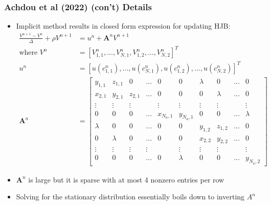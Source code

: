 \documentclass[usenames,dvipsnames, handout, aspectratio=169]{beamer}
\begin{document}
\begin{frame}[label = achdou_details_4]
\frametitle{Achdou et al (2022) (con't) Details}
\small
\begin{itemize}
\item Implicit method results in closed form expression for updating HJB:
\begin{align*}
\frac{V^{n+1} - V^n }{\Delta} + \rho V^{n+1} &= u^n + \mathbf{A}^n V^{n+1}\\
\text{where } 
V^n &= [V_{1,1}^n, ..., V_{N,1}^n, V_{1,2}^n, ..., V_{N,2}^n]^T \\
u^n &= [u(c_{1,1}^n), ..., u(c_{N,1}^n), u(c_{1,2}^n), ..., u(c_{N,2}^n)]^T\\
\mathbf{A}^n &=
\begin{bmatrix}
y_{1,1} & z_{1,1} & 0       & ... & 0      & 0 & \lambda & 0       & ... & 0\\
x_{2,1} & y_{2,1} & z_{2,1} & ... & 0      & 0 & 0       & \lambda & ... & 0\\ 
\vdots  & \vdots  & \vdots  &     & \vdots & \vdots  &\vdots  & \vdots  &     & \vdots  \\
0       & 0       &  0       &  ...  & x_{N_a,1} & y_{N_a,1}  & 0  &  0   &...& \lambda \\
\lambda & 0       & 0 &... & 0 & 0 &y_{1,2} & z_{1,2} & ...       & 0      \\
0       & \lambda & 0 &... & 0 & 0 &x_{2,2} & y_{2,2} & ... & 0      \\ 
\vdots  & \vdots  & \vdots& \vdots  &    & \vdots & \vdots  &\vdots  &   &   \vdots  \\
0       &  0      & 0 &  ...& 0 & \lambda       & 0       &  0       &  ...  & y_{N_a,2} 
\end{bmatrix}
\end{align*}
\item $\mathbf{A}^n$ is large but it is sparse with at most 4 nonzero entries per row
\item Solving for the stationary distribution essentially boils down to inverting $A^n$
\end{itemize}
\hyperlink{achdou_summary}{}
\end{frame}
\end{document}
